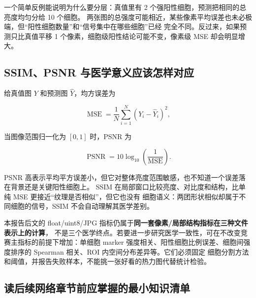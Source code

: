 \documentclass[12pt,a4paper,UTF8]{ctexart}
\begin{document}
一个简单反例能说明为什么要分层：真值里有 2 个强阳性细胞，预测把相同的总亮度均匀分给 10 个细胞。
两张图的总强度可能相近，某些像素平均误差也未必极端，但“阳性细胞数量”和“信号集中在哪些细胞”已经
完全不同。反过来，如果预测只比真值平移 1 个像素，细胞级阳性结论可能不变，像素级 MSE 却会明显增大。

\subsection{SSIM、PSNR 与医学意义应该怎样对应}

给真值图 $Y$ 和预测图 $\widehat{Y}$，均方误差为

\begin{equation}
  \operatorname{MSE}=\frac{1}{N}\sum_{i=1}^{N}(Y_i-\widehat{Y}_i)^2,
\end{equation}

当图像范围归一化为 $[0,1]$ 时，PSNR 为

\begin{equation}
  \operatorname{PSNR}=10\log_{10}\!\left(\frac{1}{\operatorname{MSE}}\right).
\end{equation}

PSNR 高表示平均平方误差小，但它对整体亮度范围敏感，也不知道一个误差落在背景还是关键阳性细胞上。
SSIM 在局部窗口比较亮度、对比度和结构\cite{ssim}，比单纯 MSE 更接近“纹理是否相似”，但它也没有
细胞语义：两团形状相似却属于不同细胞的信号，SSIM 不会自动理解其医学差别。

本报告后文的 float/uint8/JPG 指标仍属于\textbf{同一套像素/局部结构指标在三种文件表示上的计算}，
不是三个医学终点。若要进一步研究医学一致性，可在不改变竞赛主指标的前提下增加：单细胞 marker
强度相关、阳性细胞比例误差、细胞间强度排序的 Spearman 相关、ROI 内空间分布差异等。它们必须固定
细胞分割方法和阈值，并报告失败样本，不能挑一张好看的热力图代替统计检验。

\subsection{读后续网络章节前应掌握的最小知识清单}
\end{document}
